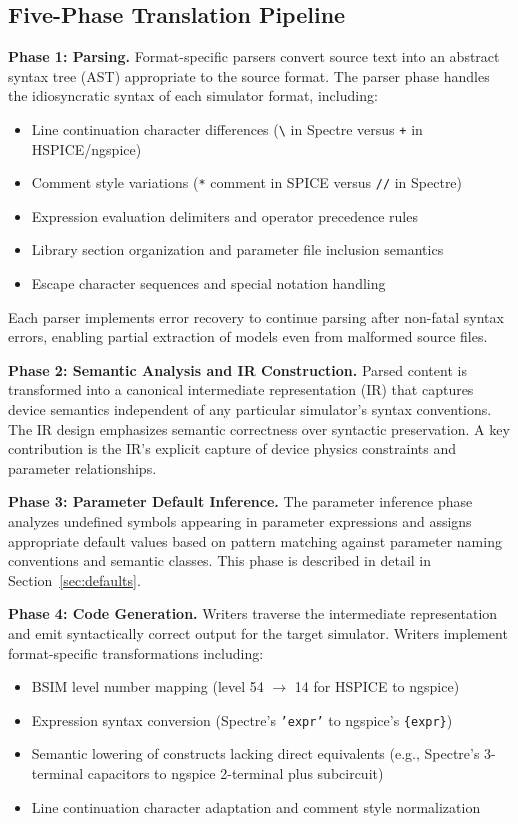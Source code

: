 \documentclass[10pt,twocolumn]{article}
\begin{document}
\subsection{Five-Phase Translation Pipeline}

\textbf{Phase 1: Parsing.} Format-specific parsers convert source text into an abstract syntax tree (AST) appropriate to the source format. The parser phase handles the idiosyncratic syntax of each simulator format, including:
\begin{itemize}
\item Line continuation character differences (\texttt{\textbackslash} in Spectre versus \texttt{+} in HSPICE/ngspice)
\item Comment style variations (\texttt{*} comment in SPICE versus \texttt{//} in Spectre)
\item Expression evaluation delimiters and operator precedence rules
\item Library section organization and parameter file inclusion semantics
\item Escape character sequences and special notation handling
\end{itemize}

Each parser implements error recovery to continue parsing after non-fatal syntax errors, enabling partial extraction of models even from malformed source files.

\textbf{Phase 2: Semantic Analysis and IR Construction.} Parsed content is transformed into a canonical intermediate representation (IR) that captures device semantics independent of any particular simulator's syntax conventions. The IR design emphasizes semantic correctness over syntactic preservation. A key contribution is the IR's explicit capture of device physics constraints and parameter relationships.

\textbf{Phase 3: Parameter Default Inference.} The parameter inference phase analyzes undefined symbols appearing in parameter expressions and assigns appropriate default values based on pattern matching against parameter naming conventions and semantic classes. This phase is described in detail in Section~\ref{sec:defaults}.

\textbf{Phase 4: Code Generation.} Writers traverse the intermediate representation and emit syntactically correct output for the target simulator. Writers implement format-specific transformations including:
\begin{itemize}
\item BSIM level number mapping (level 54 $\rightarrow$ 14 for HSPICE to ngspice)
\item Expression syntax conversion (Spectre's \texttt{'expr'} to ngspice's \texttt{\{expr\}})
\item Semantic lowering of constructs lacking direct equivalents (e.g., Spectre's 3-terminal capacitors to ngspice 2-terminal plus subcircuit)
\item Line continuation character adaptation and comment style normalization
\end{itemize}
\end{document}
